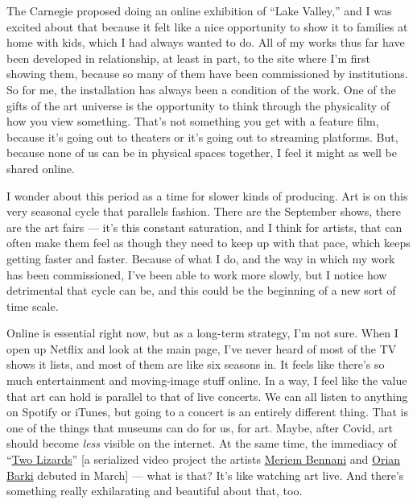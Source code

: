 The Carnegie proposed doing an online exhibition of ``Lake Valley,'' and
I was excited about that because it felt like a nice opportunity to show
it to families at home with kids, which I had always wanted to do. All
of my works thus far have been developed in relationship, at least in
part, to the site where I'm first showing them, because so many of them
have been commissioned by institutions. So for me, the installation has
always been a condition of the work. One of the gifts of the art
universe is the opportunity to think through the physicality of how you
view something. That's not something you get with a feature film,
because it's going out to theaters or it's going out to streaming
platforms. But, because none of us can be in physical spaces together, I
feel it might as well be shared online.

I wonder about this period as a time for slower kinds of producing. Art
is on this very seasonal cycle that parallels fashion. There are the
September shows, there are the art fairs --- it's this constant
saturation, and I think for artists, that can often make them feel as
though they need to keep up with that pace, which keeps getting faster
and faster. Because of what I do, and the way in which my work has been
commissioned, I've been able to work more slowly, but I notice how
detrimental that cycle can be, and this could be the beginning of a new
sort of time scale.

Online is essential right now, but as a long-term strategy, I'm not
sure. When I open up Netflix and look at the main page, I've never heard
of most of the TV shows it lists, and most of them are like six seasons
in. It feels like there's so much entertainment and moving-image stuff
online. In a way, I feel like the value that art can hold is parallel to
that of live concerts. We can all listen to anything on Spotify or
iTunes, but going to a concert is an entirely different thing. That is
one of the things that museums can do for us, for art. Maybe, after
Covid, art should become \emph{less} visible on the internet. At the
same time, the immediacy of
``\href{https://www.nytimes.com/2020/04/22/arts/design/lizards-instagram-coronavirus-stars.html}{Two
Lizards}'' {[}a serialized video project the artists
\href{https://www.nytimes.com/2015/10/28/t-magazine/art-meriem-bennani-hijab-video.html}{Meriem
Bennani} and \href{https://www.orianbarki.com/}{Orian Barki} debuted in
March{]} --- what is that? It's like watching art live. And there's
something really exhilarating and beautiful about that, too.

